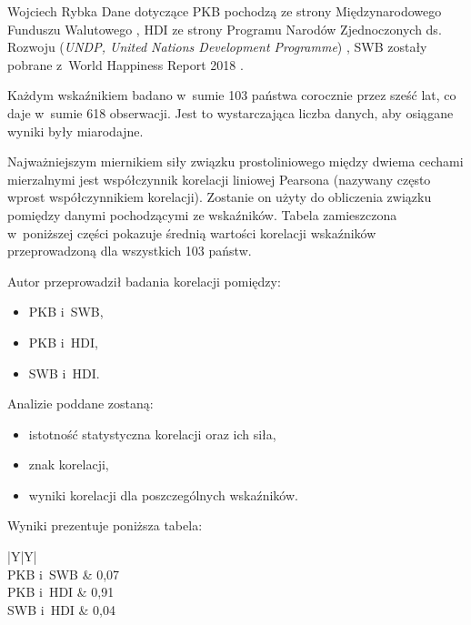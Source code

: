 \begin{artplenv}{Wojciech Rybka}
Dane dotyczące PKB pochodzą ze strony Międzynarodowego Funduszu Walutowego
\parencite{international_monetary_fund_world_2019a},
HDI ze strony Programu Narodów Zjednoczonych ds. Rozwoju (\textit{UNDP, United Nations
Development Programme})
\parencite{united_nations_development_programme_human_2019},
SWB zostały
pobrane z~World Happiness Report 2018
\parencite{noauthor_world_2018}.

Każdym wskaźnikiem badano w~sumie 103 państwa corocznie przez sześć lat, co daje w~sumie 618 obserwacji. Jest to
wystarczająca liczba danych, aby osiągane wyniki były miarodajne. 

Najważniejszym miernikiem siły związku prostoliniowego między dwiema cechami mierzalnymi jest współczynnik korelacji
liniowej Pearsona (nazywany często wprost współczynnikiem korelacji). Zostanie on użyty do obliczenia związku pomiędzy
danymi pochodzącymi ze wskaźników. Tabela zamieszczona w~poniższej części pokazuje średnią wartości korelacji
wskaźników przeprowadzoną dla wszystkich 103 państw.


Autor przeprowadził badania korelacji pomiędzy:

\begin{itemize}
\item PKB i~SWB,
\item PKB i~HDI,
\item SWB i~HDI.
\end{itemize}
Analizie poddane zostaną:

\begin{itemize}
\item istotność statystyczna korelacji oraz ich siła,
\item znak korelacji,
\item wyniki korelacji dla poszczególnych wskaźników.
\end{itemize}
Wyniki prezentuje poniższa tabela:


\captionsetup[table]{name=Tabela}
\begin{table}[H]
	\begin{tabularx}{\textwidth}{|Y|Y|}
		\hline
		\\\hline
		PKB i~SWB &
		0,07\\\hline
		PKB i~HDI &
		0,91\\\hline
		SWB i~HDI &
		0,04\\\hline
	\end{tabularx}
	

\end{table}
\end{artplenv}
